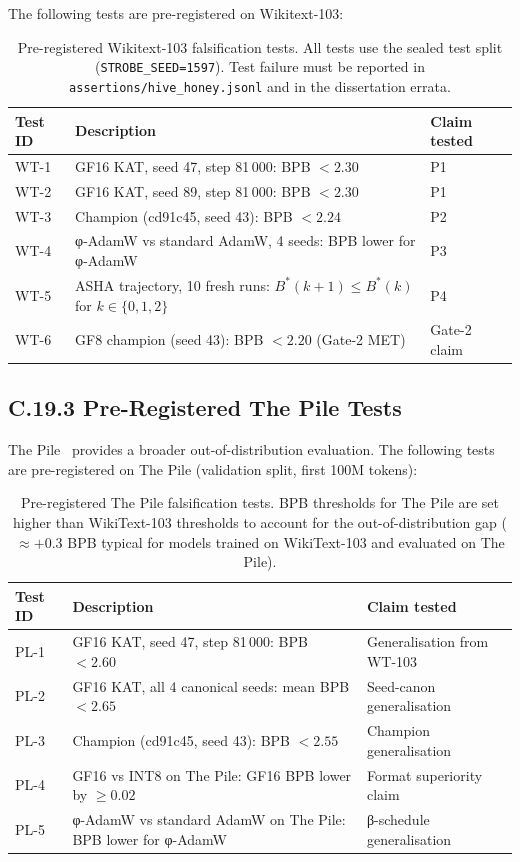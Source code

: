 The following tests are pre-registered on Wikitext-103:

\begin{table}[h]
\centering
\begin{tabular}{lp{7cm}l}
\toprule
\textbf{Test ID} & \textbf{Description} & \textbf{Claim tested} \\
\midrule
WT-1 & GF16 KAT, seed 47, step 81\,000: BPB $< 2.30$
    & P1 \\
WT-2 & GF16 KAT, seed 89, step 81\,000: BPB $< 2.30$
    & P1 \\
WT-3 & Champion (cd91c45, seed 43): BPB $< 2.24$
    & P2 \\
WT-4 & φ-AdamW vs standard AdamW, 4 seeds: BPB lower for φ-AdamW
    & P3 \\
WT-5 & ASHA trajectory, 10 fresh runs: $B^*(k+1) \leq B^*(k)$ for
      $k \in \{0,1,2\}$ & P4 \\
WT-6 & GF8 champion (seed 43): BPB $< 2.20$ (Gate-2 MET)
    & Gate-2 claim \\
\bottomrule
\end{tabular}
\caption{Pre-registered Wikitext-103 falsification tests.  All tests
use the sealed test split (\texttt{STROBE\_SEED=1597}).  Test failure
must be reported in \texttt{assertions/hive\_honey.jsonl} and in the
dissertation errata.}
\end{table}

\subsection*{C.19.3 Pre-Registered The Pile Tests}

The Pile~\cite{gao2020pile} provides a broader out-of-distribution
evaluation.  The following tests are pre-registered on The Pile
(validation split, first 100M tokens):

\begin{table}[h]
\centering
\begin{tabular}{lp{7cm}l}
\toprule
\textbf{Test ID} & \textbf{Description} & \textbf{Claim tested} \\
\midrule
PL-1 & GF16 KAT, seed 47, step 81\,000: BPB $< 2.60$
    & Generalisation from WT-103 \\
PL-2 & GF16 KAT, all 4 canonical seeds: mean BPB $< 2.65$
    & Seed-canon generalisation \\
PL-3 & Champion (cd91c45, seed 43): BPB $< 2.55$
    & Champion generalisation \\
PL-4 & GF16 vs INT8 on The Pile: GF16 BPB lower by $\geq 0.02$
    & Format superiority claim \\
PL-5 & φ-AdamW vs standard AdamW on The Pile: BPB lower for φ-AdamW
    & β-schedule generalisation \\
\bottomrule
\end{tabular}
\caption{Pre-registered The Pile falsification tests.  BPB thresholds
for The Pile are set higher than WikiText-103 thresholds to account for
the out-of-distribution gap ($\approx +0.3$ BPB typical for models
trained on WikiText-103 and evaluated on The Pile).}
\end{table}

